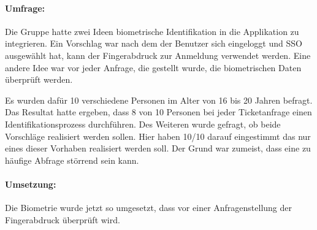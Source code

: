 \paragraph{Umfrage:} Die Gruppe hatte zwei Ideen biometrische Identifikation in die Applikation zu integrieren. Ein Vorschlag war nach dem der Benutzer sich eingeloggt und SSO ausgewählt hat, kann der Fingerabdruck zur Anmeldung verwendet werden.
Eine andere Idee war vor jeder Anfrage, die gestellt wurde, die biometrischen Daten überprüft werden.

Es wurden dafür 10 verschiedene Personen im Alter von 16 bis 20 Jahren befragt. Das Resultat hatte ergeben, dass 8 von 10 Personen bei jeder Ticketanfrage einen Identifikationsprozess durchführen.
Des Weiteren wurde gefragt, ob beide Vorschläge realisiert werden sollen. Hier haben 10/10 darauf eingestimmt das nur eines dieser Vorhaben realisiert werden soll. Der Grund war zumeist, dass eine zu häufige Abfrage störrend sein kann.

\paragraph{Umsetzung:} Die Biometrie wurde jetzt so umgesetzt, dass vor einer Anfragenstellung der Fingerabdruck überprüft wird.
